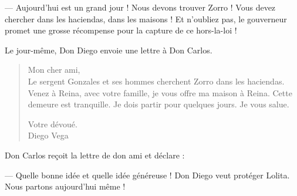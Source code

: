 --- Aujourd'hui est un grand jour ! Nous devons trouver Zorro ! Vous devez chercher dans les haciendas, dans les maisons ! Et
    n'oubliez pas, le gouverneur promet une grosse récompense pour la capture de ce hors-la-loi !

Le jour-même, Don Diego envoie une lettre à Don Carlos.

\begin{quote}
Mon cher ami,\\
Le sergent Gonzales et ses hommes cherchent Zorro dans les haciendas. Venez à Reina, avec votre famille, je vous offre ma maison à
Reina. Cette demeure est tranquille. Je dois partir pour quelques jours. Je vous salue.

Votre dévoué.\\
Diego Vega
\end{quote}


Don Carlos reçoit la lettre de don ami et déclare :

--- Quelle bonne idée et quelle idée généreuse ! Don Diego veut protéger Lolita. Nous partons aujourd'hui même !
